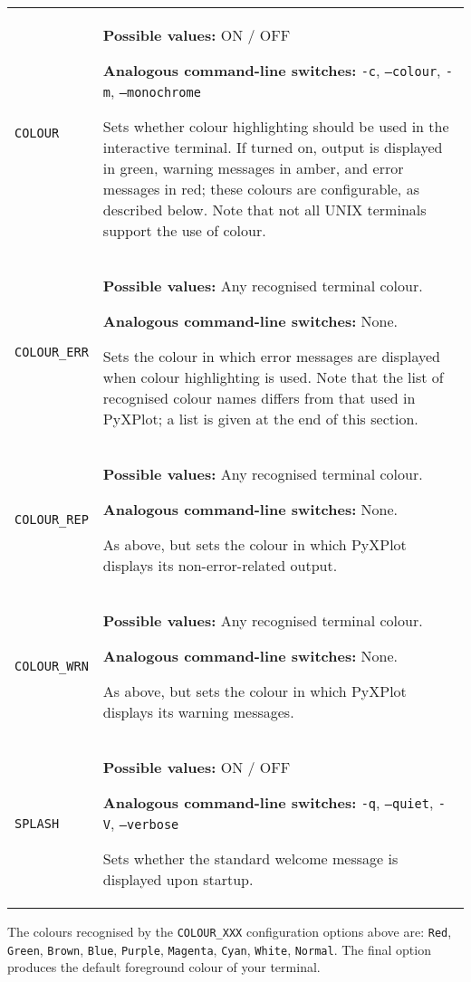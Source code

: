 \documentclass[a4paper,onecolumn,11pt]{book}
\begin{document}
\begin{longtable}{p{3.4cm}p{9cm}}
\texttt{COLOUR} & \textbf{Possible values:} ON / OFF

                  \textbf{Analogous command-line switches:} \texttt{-c}, \texttt{--colour}, \texttt{-m}, \texttt{--monochrome}

                  Sets whether colour highlighting should be used in the interactive terminal. If turned on, output is displayed in green, warning messages in amber, and error messages in red; these colours are configurable, as described below. Note that not all UNIX terminals support the use of colour.
                   \\
\texttt{COLOUR\_ERR} & \textbf{Possible values:} Any recognised terminal colour.

                  \textbf{Analogous command-line switches:} None.

                  Sets the colour in which error messages are displayed when colour highlighting is used. Note that the list of recognised colour names differs from that used in PyXPlot; a list is given at the end of this section.
                   \\
\texttt{COLOUR\_REP} & \textbf{Possible values:} Any recognised terminal colour.

                  \textbf{Analogous command-line switches:} None.

                  As above, but sets the colour in which PyXPlot displays its non-error-related output.
                   \\
\texttt{COLOUR\_WRN} & \textbf{Possible values:} Any recognised terminal colour.

                  \textbf{Analogous command-line switches:} None.

                  As above, but sets the colour in which PyXPlot displays its warning messages.
                   \\
\texttt{SPLASH} & \textbf{Possible values:} ON / OFF

                  \textbf{Analogous command-line switches:} \texttt{-q}, \texttt{--quiet}, \texttt{-V}, \texttt{--verbose}

                  Sets whether the standard welcome message is displayed upon startup.
                   \\
\end{longtable}

The colours recognised by the \texttt{COLOUR\_XXX} configuration options above are: \texttt{Red}, \texttt{Green}, \texttt{Brown}, \texttt{Blue}, \texttt{Purple}, \texttt{Magenta}, \texttt{Cyan}, \texttt{White}, \texttt{Normal}. The final option produces the default foreground colour of your terminal.
\end{document}
